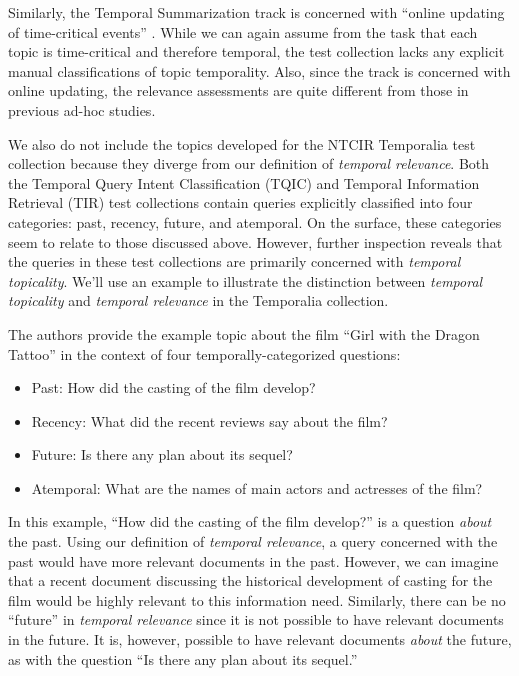 \documentclass{asist}
\begin{document}
Similarly, the Temporal Summarization track is concerned with ``online updating of time-critical events'' \cite{Guo2013}. While we can again assume from the task that each topic is time-critical and therefore temporal, the test collection lacks any explicit manual classifications of topic temporality.  Also, since the track is concerned with online updating, the relevance assessments are quite different from those in previous ad-hoc studies.

We also do not include the topics developed for the NTCIR Temporalia test collection \cite{Joho2014} because they diverge from our definition of \emph{temporal relevance}.  Both the Temporal Query Intent Classification (TQIC) and Temporal Information Retrieval (TIR) test collections contain queries explicitly classified into four categories: past, recency, future, and atemporal. On the surface, these categories seem to relate to those discussed above. However, further inspection reveals that the queries in these test collections are primarily concerned with \emph{temporal topicality}.  
We'll use an example to illustrate the distinction between \emph{temporal topicality} and \emph{temporal relevance} in the Temporalia collection. 

The authors provide the example topic about the film ``Girl with the Dragon Tattoo'' in the context of four temporally-categorized questions:

\begin{itemize}
\item Past: How did the casting of the film develop?
\item Recency: What did the recent reviews say about the film?
\item Future: Is there any plan about its sequel?
\item Atemporal: What are the names of main actors and actresses of the film?
\end{itemize}

In this example, ``How did the casting of the film develop?'' is a question \emph{about} the past. Using our definition of \emph{temporal relevance}, a query concerned with the past would have more relevant documents in the past. However, we can imagine that a recent document discussing the historical development of casting for the film would be highly relevant to this information need. Similarly, there can be no ``future'' in \emph{temporal relevance} since it is not possible to have relevant documents in the future. It is, however, possible to have relevant documents \emph{about} the future, as with the question ``Is there any plan about its sequel.''
\end{document}
